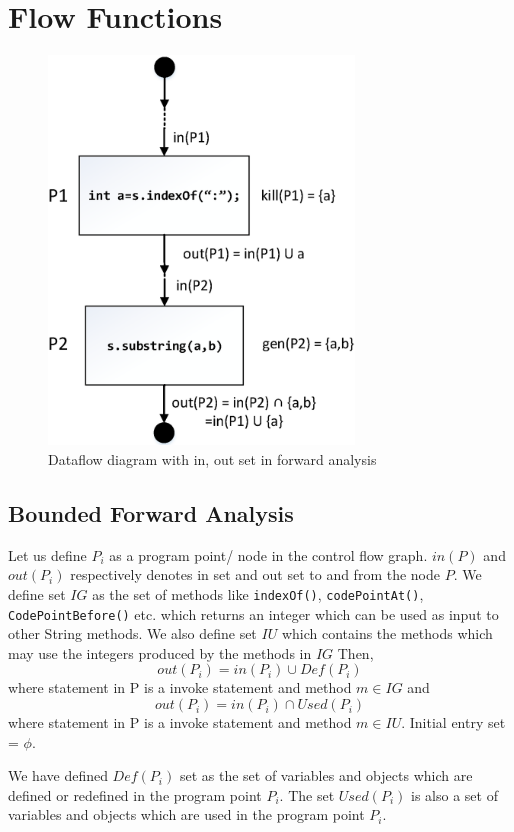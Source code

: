 \section{Flow Functions}
\label{sec:flowFunctions}

\begin{figure}[htb]
\centering
\includegraphics[width=3.2in]{images/dataflow.png}
\caption{Dataflow diagram with in, out set in forward analysis}
\label{fig:dataflow}
\end{figure}

\subsection{Bounded Forward Analysis}
\label{subsec:boundedForward}

Let us define $P_i$ as a program point/ node in the control flow graph. $in(P)$
and $out(P_i)$ respectively denotes in set and out set to and from the node $P$.
We define set $IG$ as the set of methods like \texttt{indexOf()},
\texttt{codePointAt()}, \texttt{CodePointBefore()} etc. which returns an integer
which can be used as input to other String methods. We also define set $IU$
which contains the methods which may use the integers produced by the methods in
$IG$ Then, 
$$out(P_i) = in(P_i) \cup Def(P_i)$$ where statement in P is a invoke statement
and method $m \in IG$ and
$$out(P_i) = in(P_i) \cap Used(P_i)$$ where statement in P is a invoke statement
and method $m \in IU$. Initial entry set = ${\phi}$.


We have defined $Def(P_i)$ set as the set of variables and objects which are
defined or redefined in the program point $P_i$. The set $Used(P_i)$ is also a
set of variables and objects which are used in the program point $P_i$.

